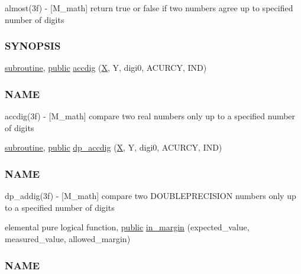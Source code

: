 \begin{DoxyCompactItemize}
\begin{DoxyCompactList}
almost(3f) -\/ \mbox{[}M\+\_\+math\mbox{]} return true or false if two numbers agree up to specified number of digits \subsubsection*{S\+Y\+N\+O\+P\+S\+IS}\end{DoxyCompactList}\item 
\hyperlink{M__stopwatch_83_8txt_acfbcff50169d691ff02d4a123ed70482}{subroutine}, \hyperlink{M__stopwatch_83_8txt_a2f74811300c361e53b430611a7d1769f}{public} \hyperlink{namespacem__math_a29d92d203eee5fb3ccf5fee7abce7450}{accdig} (\hyperlink{intro__blas1_83_8txt_ac8596739bc875e90fe6e2ecf98e87906}{X}, Y, digi0, A\+C\+U\+R\+CY, I\+ND)
\begin{DoxyCompactList}\small\item\em \subsubsection*{N\+A\+ME}

accdig(3f) -\/ \mbox{[}M\+\_\+math\mbox{]} compare two real numbers only up to a specified number of digits \end{DoxyCompactList}\item 
\hyperlink{M__stopwatch_83_8txt_acfbcff50169d691ff02d4a123ed70482}{subroutine}, \hyperlink{M__stopwatch_83_8txt_a2f74811300c361e53b430611a7d1769f}{public} \hyperlink{namespacem__math_a08a8a6121a85932548baee1a0e3af4d9}{dp\+\_\+accdig} (\hyperlink{intro__blas1_83_8txt_ac8596739bc875e90fe6e2ecf98e87906}{X}, Y, digi0, A\+C\+U\+R\+CY, I\+ND)
\begin{DoxyCompactList}\small\item\em \subsubsection*{N\+A\+ME}

dp\+\_\+addig(3f) -\/ \mbox{[}M\+\_\+math\mbox{]} compare two D\+O\+U\+B\+L\+E\+P\+R\+E\+C\+I\+S\+I\+ON numbers only up to a specified number of digits \end{DoxyCompactList}\item 
elemental pure logical function, \hyperlink{M__stopwatch_83_8txt_a2f74811300c361e53b430611a7d1769f}{public} \hyperlink{namespacem__math_aa53768584a404262081f26d5d61e1e03}{in\+\_\+margin} (expected\+\_\+value, measured\+\_\+value, allowed\+\_\+margin)
\begin{DoxyCompactList}\small\item\em \subsubsection*{N\+A\+ME}


\end{DoxyCompactList}
\end{DoxyCompactItemize}
